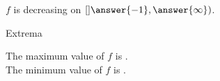 \documentclass{ximera}
\begin{document}
\begin{exercise}
\begin{question}
$f$ is decreasing on $\left[] \answer{-1}, \answer{\infty} \right)$. \\

\end{question}









\begin{question} Extrema


The maximum value of $f$ is . \\

The minimum value of $f$ is . \\

\end{question}














\end{exercise}
\end{document}
